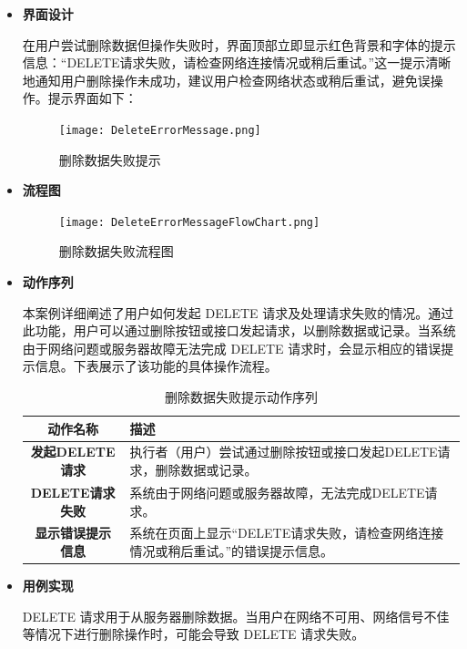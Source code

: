 \begin{itemize}
	
	\item \textbf{界面设计}
	
	在用户尝试删除数据但操作失败时，界面顶部立即显示红色背景和字体的提示信息：“DELETE请求失败，请检查网络连接情况或稍后重试。”这一提示清晰地通知用户删除操作未成功，建议用户检查网络状态或稍后重试，避免误操作。提示界面如下：
	
	\begin{figure}[H]
		\centering
		\texttt{[image: DeleteErrorMessage.png]}
		\caption{删除数据失败提示}
		\label{DeleteErrorMessage}
	\end{figure}
	
	\item \textbf{流程图}
	
	\begin{figure}[H]
		\centering
		\texttt{[image: DeleteErrorMessageFlowChart.png]}
		\caption{删除数据失败流程图}
		\label{fig:delete}
	\end{figure}	
	
	\item \textbf{动作序列}
	
	本案例详细阐述了用户如何发起 DELETE 请求及处理请求失败的情况。通过此功能，用户可以通过删除按钮或接口发起请求，以删除数据或记录。当系统由于网络问题或服务器故障无法完成 DELETE 请求时，会显示相应的错误提示信息。下表展示了该功能的具体操作流程。
	
	\begin{table}[H]
		\centering
		\caption{删除数据失败提示动作序列}
		\renewcommand\arraystretch{1.5}
		\begin{tabular}{|c|>{\raggedright\arraybackslash}p{10cm}|}
			\hline
			\textbf{动作名称} & \textbf{描述} \\ \hline
			\textbf{发起DELETE请求} & 执行者（用户）尝试通过删除按钮或接口发起DELETE请求，删除数据或记录。 \\ \hline
			\textbf{DELETE请求失败} & 系统由于网络问题或服务器故障，无法完成DELETE请求。 \\ \hline
			\textbf{显示错误提示信息} & 系统在页面上显示“DELETE请求失败，请检查网络连接情况或稍后重试。”的错误提示信息。 \\ \hline
		\end{tabular}
	\end{table}
	
	\item \textbf{用例实现}
	
	DELETE 请求用于从服务器删除数据。当用户在网络不可用、网络信号不佳等情况下进行删除操作时，可能会导致 DELETE 请求失败。
	

\end{itemize}
